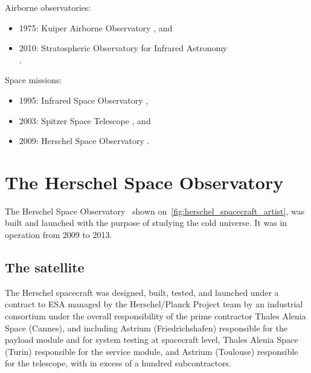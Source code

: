 \begin{samepage}
Airborne observatories:
\begin{itemize}[noitemsep]
    \item 1975: Kuiper Airborne Observatory                      \parencite{gillespie1981kuiper}, and
    \item 2010: Stratospheric Observatory for Infrared Astronomy\\ \parencite{becklin2012stratospheric}.
\end{itemize}
\end{samepage}

\begin{samepage}
Space missions:
\begin{itemize}[noitemsep]
    \item 1995: Infrared Space Observatory  \parencite{isoHandbook1},
    \item 2003: Spitzer Space Telescope     \parencite{werner2004spitzer}, and
    \item 2009: Herschel Space Observatory  \parencite{AA_518_L1}.
\end{itemize}
\end{samepage}



\FloatBarrier
\section{The Herschel Space Observatory}

The Herschel Space Observatory~\parencite{AA_518_L1}
shown on~\cref{fig:herschel_spacecraft_artist},
was built and launched with the purpose of studying the cold universe.
It was in operation from 2009 to 2013.


\subsection{The satellite}

The Herschel spacecraft was designed, built, tested, and launched under a contract to ESA managed by the Herschel/Planck Project team by an industrial consortium under the overall responsibility of the prime contractor Thales Alenia Space (Cannes), and including Astrium (Friedrichshafen) responsible for the payload module and for system testing at spacecraft level, Thales Alenia Space (Turin) responsible for the service module, and Astrium (Toulouse) responsible for the telescope, with in excess of a hundred subcontractors.

